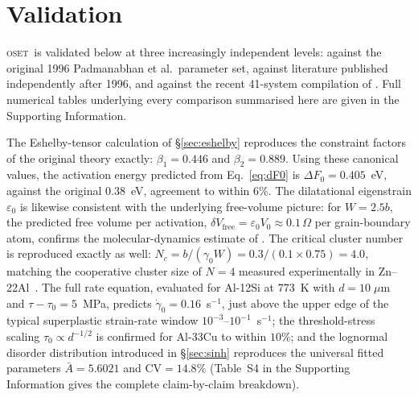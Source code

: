 \documentclass[3p]{elsarticle}
\newcommand{\OSET}{\textsc{oset}}
\newcommand{\dF}{\Delta F_0}
\newcommand{\gz}{\gamma_0}
\begin{document}
\section{Validation}
\label{sec:validation}

\OSET\ is validated below at three increasingly independent levels:
against the original 1996 Padmanabhan et al.\ parameter set, against
literature published independently after 1996, and against the
recent 41-system compilation of
\citet{harisankar2025}. Full numerical tables underlying
every comparison summarised here are given in the Supporting
Information.

The Eshelby-tensor calculation of \S\ref{sec:eshelby} reproduces the
constraint factors of the original theory exactly: $\beta_1=0.446$
and $\beta_2=0.889$. Using these canonical values, the activation
energy predicted from Eq.~\eqref{eq:dF0} is $\dF=0.405$~eV, against
the original $0.38$~eV, agreement to within 6\%. The dilatational
eigenstrain $\varepsilon_0$ is likewise consistent with the
underlying free-volume picture: for $W=2.5b$, the predicted free
volume per activation, $\delta V_\text{free}=\varepsilon_0
V_0\approx0.1\,\Omega$ per grain-boundary atom, confirms the
molecular-dynamics estimate of \citet{wolf1990}. The critical
cluster number is reproduced exactly as well: $N_c=b/(\gz
W)=0.3/(0.1\times0.75)=4.0$, matching the cooperative cluster size
of $N=4$ measured experimentally in Zn--22Al~\citep{astanin-part2}.
The full rate equation, evaluated for Al-12Si at $773$~K with
$d=10\;\mu$m and $\tau-\tau_0=5$~MPa, predicts
$\dot\gz=0.16$~s$^{-1}$, just above the upper edge of the typical
superplastic strain-rate window $10^{-3}$--$10^{-1}$~s$^{-1}$; the
threshold-stress scaling $\tau_0\propto d^{-1/2}$ is confirmed for
Al-33Cu to within $10\%$; and the lognormal disorder distribution
introduced in \S\ref{sec:sinh} reproduces the universal fitted
parameters $\bar A=5.6021$ and $\mathrm{CV}=14.8\%$ (Table~S4 in the
Supporting Information gives the complete claim-by-claim breakdown).
\end{document}
